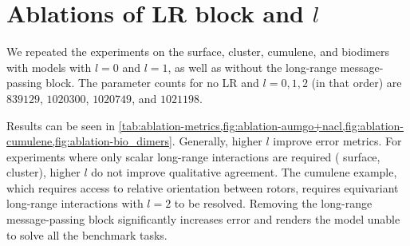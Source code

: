 \documentclass[10pt]{article} %
\begin{document}
\clearpage
\section{Ablations of LR block and $l$}
\label{sec:apx-ablations}

We repeated the experiments on the  surface,  cluster, cumulene, and biodimers with \lorem models with $l=0$ and $l=1$, as well as without the long-range message-passing block. The parameter counts for no LR and $l=0,1,2$ (in that order) are  $839129$, $1020300$, $1020749$, and $1021198$.

Results can be seen in \cref{tab:ablation-metrics,fig:ablation-aumgo+nacl,fig:ablation-cumulene,fig:ablation-bio_dimers}.
Generally, higher $l$ improve error metrics.
For experiments where only scalar long-range interactions are required ( surface,  cluster), higher $l$ do not improve qualitative agreement.
The cumulene example, which requires access to relative orientation between rotors, requires equivariant long-range interactions with $l=2$ to be resolved.
Removing the long-range message-passing block significantly increases error and renders the model unable to solve all the benchmark tasks.


\begin{table}
    \caption{Root mean squared errors for energy $E$ and forces $\F$ for datasets used in Sec. 6.1 of the main text, for different \lorem variants. See Tab. 1 of the main text for details.}
    \centering
    
    \label{tab:ablation-metrics}
\end{table}
\end{document}

